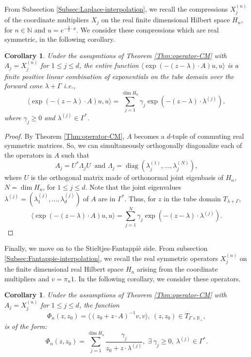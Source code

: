 \documentclass[11pt,reqno]{amsart}
\theoremstyle{plain}
\newtheorem{corollary}[theorem]{Corollary}
\theoremstyle{definition}
\numberwithin{equation}{section}
\begin{document}
From Subsection \ref{Subsec:Laplace-interpolation}, we recall the compressions $X^{(n)}_j$ of the coordinate multipliers $X_j$ on the real finite dimensional Hilbert space $H_n$, for $n\in \mathbb{N}$ and $u=e^{-\frac{\lambda}{2} \cdot x}$. We consider these compressions which are real symmetric, in the following corollary. 
\begin{corollary} \label{Cor:comm-LT}
Under the assupmtions of Theorem \ref{Thm:operator-CM} with $A_j = X^{(n)}_j$ for $1\leq j \leq d$,  the entire function $\langle \exp (-(z-\lambda) \cdot A) u, u \rangle$
 is a finite positive linear combination of exponentials on the tube domain over the forward cone $\lambda + \Gamma$ i.e., 
 $$
 \langle \exp (-(z-\lambda) \cdot A) u, u \rangle = \sum_{j=1}^{\operatorname{dim} H_n} \gamma_j \exp(-(z-\lambda) \cdot \lambda^{(j)}),
 $$
 where $\gamma_j \geq 0$ and $\lambda^{(j)} \in \Gamma^*$.
\end{corollary}
\begin{proof}
By Theorem \ref{Thm:operator-CM}, $A$ becomes a $d$-tuple of commuting real symmetric matrices. So, we can simultaneously orthogonally diagonalize each of the operators in $A$ such that
$$
A_j = U^* \Lambda_j U \ \text{ and } \Lambda_j = \operatorname{diag} (\lambda^{(1)}_j, \ldots, \lambda^{(N)}_j),
$$
where $U$ is the orthogonal matrix made of orthonormal joint eigenbasis of $H_n$, $N= \operatorname{dim} H_n$, for $1\leq j \leq d$. Note that the joint eigenvalues $\lambda^{(j)}=(\lambda^{(j)}_1, \ldots, \lambda^{(j)}_d)$ of $A$  are in $\Gamma^*$. Thus, for $z$ in the tube domain $T_{\lambda+ \Gamma}$,
$$
\langle \exp (-(z-\lambda) \cdot A) u, u \rangle = \sum_{j=1}^N \gamma_j \exp(-(z-\lambda) \cdot \lambda^{(j)}).
$$ 
\end{proof}

Finally, we move on to the Stieltjes-Fantappi\`e side. From subsection \ref{Subsec:Fantappie-interpolation}, we recall the real symmetric operators $X^{(n)}_j$ on the finite dimensional real Hilbert space $H_n$ arising from the coordinate multipliers and $v= \pi_n 1$. In the following corollary, we consider these operators.
\begin{corollary} \label{Cor:comm-FT}
 Under the assumptions of Theorem \ref{Thm:operator-CM} with $A_j = X^{(n)}_j$ for $1\leq j \leq d$, the function
 $$
 \Phi_n(z, z_0)=  \langle (z_0 + z \cdot A)^{-1} v, v \rangle, \ (z, z_0) \in T_{\Gamma \times \mathbb{R}_+},
 $$
 is of the form:
 $$
 \Phi_n(z, z_0) = \sum_{j=1}^{\operatorname{dim} H_n} \frac{\gamma_j}{z_0 + z\cdot \lambda^{(j)}}, \, \, \exists \ \gamma_j \geq 0, \ \lambda^{(j)} \in \Gamma^*.
 $$
\end{corollary}
\end{document}
